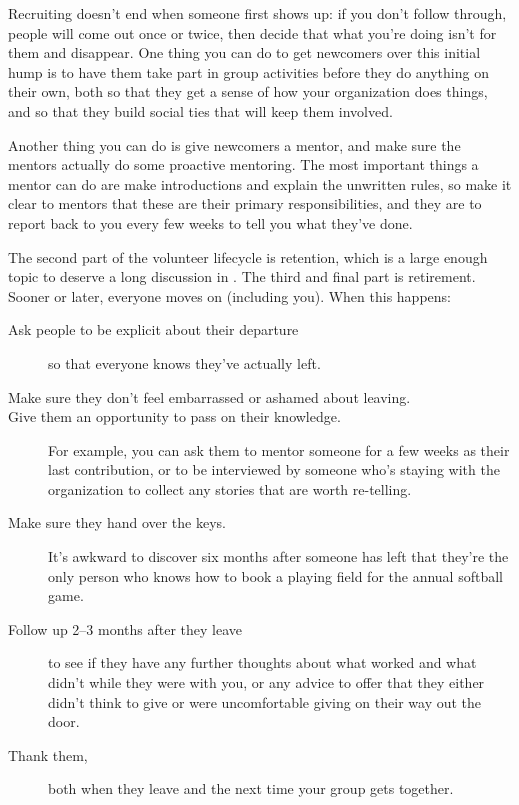 Recruiting doesn't end when someone first shows up: if you don't
follow through, people will come out once or twice, then decide that
what you're doing isn't for them and disappear. One thing you can do
to get newcomers over this initial hump is to have them take part in
group activities before they do anything on their own, both so that
they get a sense of how your organization does things, and so that
they build social ties that will keep them involved.

Another thing you can do is give newcomers a mentor, and make sure the
mentors actually do some proactive mentoring. The most important
things a mentor can do are make introductions and explain the
unwritten rules, so make it clear to mentors that these are their
primary responsibilities, and they are to report back to you every few
weeks to tell you what they've done.

The second part of the volunteer lifecycle is retention, which is a
large enough topic to deserve a long discussion in
.  The third and final part is
retirement. Sooner or later, everyone moves on (including you). When
this happens:

\begin{description}

\item[Ask people to be explicit about their departure] so that
  everyone knows they've actually left.

\item[Make sure they don't feel embarrassed or ashamed about leaving.]

\item[Give them an opportunity to pass on their knowledge.] For
  example, you can ask them to mentor someone for a few weeks as their
  last contribution, or to be interviewed by someone who's staying
  with the organization to collect any stories that are worth
  re-telling.

\item[Make sure they hand over the keys.] It's awkward to discover six
  months after someone has left that they're the only person who knows
  how to book a playing field for the annual softball game.

\item[Follow up 2--3 months after they leave] to see if they have any
  further thoughts about what worked and what didn't while they were
  with you, or any advice to offer that they either didn't think to
  give or were uncomfortable giving on their way out the door.

\item[Thank them,] both when they leave and the next time your group
  gets together.

\end{description}


